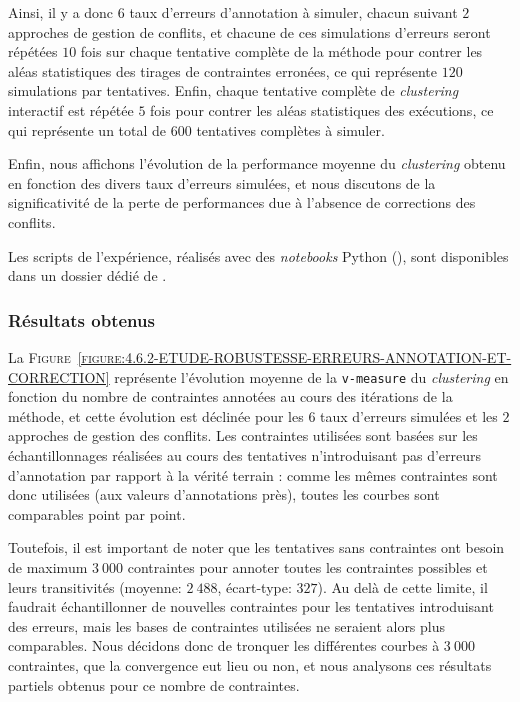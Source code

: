 			Ainsi, il y a donc $6$ taux d'erreurs d'annotation à simuler, chacun suivant $2$ approches de gestion de conflits, et chacune de ces simulations d'erreurs seront répétées $10$ fois sur chaque tentative complète de la méthode pour contrer les aléas statistiques des tirages de contraintes erronées, ce qui représente $120$ simulations par tentatives.
			Enfin, chaque tentative complète de \textit{clustering} interactif est répétée $5$ fois pour contrer les aléas statistiques des exécutions, ce qui représente un total de $600$ tentatives complètes à simuler.

			Enfin, nous affichons l'évolution de la performance moyenne du \textit{clustering} obtenu en fonction des divers taux d'erreurs simulées, et nous discutons de la significativité de la perte de performances due à l'absence de corrections des conflits.
			
			\begin{leftBarInformation}
				Les scripts de l'expérience, réalisés avec des \textit{notebooks} Python (\cite{van-rossum-drake:2009:python-reference-manual}), sont disponibles dans un dossier dédié de \cite{schild:2021:cognitivefactory-interactiveclusteringcomparativestudy}.
			\end{leftBarInformation}

		\subsubsection{Résultats obtenus}
		
			La \textsc{Figure~\ref{figure:4.6.2-ETUDE-ROBUSTESSE-ERREURS-ANNOTATION-ET-CORRECTION}} représente l'évolution moyenne de la \texttt{v-measure} du \textit{clustering} en fonction du nombre de contraintes annotées au cours des itérations de la méthode, et cette évolution est déclinée pour les $6$ taux d'erreurs simulées et les $2$ approches de gestion des conflits.
			Les contraintes utilisées sont basées sur les échantillonnages réalisées au cours des tentatives n'introduisant pas d'erreurs d'annotation par rapport à la vérité terrain : comme les mêmes contraintes sont donc utilisées (aux valeurs d'annotations près), toutes les courbes sont comparables point par point.
			
			\begin{leftBarWarning}
				Toutefois, il est important de noter que les tentatives sans contraintes ont besoin de maximum $3~000$ contraintes pour annoter toutes les contraintes possibles et leurs transitivités (moyenne: $2~488$, écart-type: $327$).
				Au delà de cette limite, il faudrait échantillonner de nouvelles contraintes pour les tentatives introduisant des erreurs, mais les bases de contraintes utilisées ne seraient alors plus comparables.
				Nous décidons donc de tronquer les différentes courbes à $3~000$ contraintes, que la convergence eut lieu ou non, et nous analysons ces résultats partiels obtenus pour ce nombre de contraintes.
			\end{leftBarWarning}
			
